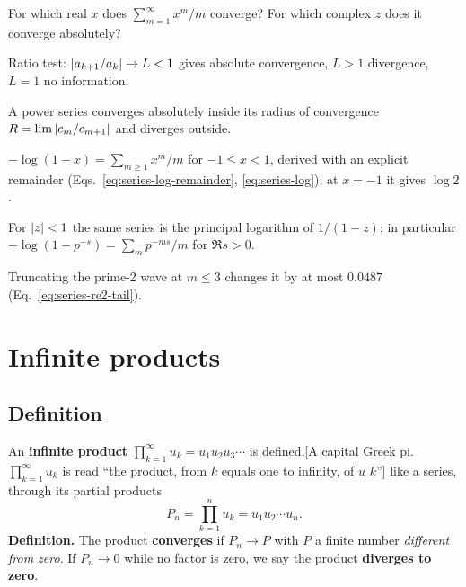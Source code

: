 \begin{checkpoint}
For which real $x$ does $\sum_{m=1}^\infty x^m/m$ converge? For which complex $z$ does it converge absolutely?
\end{checkpoint}

\begin{keyideas}
\item Ratio test: $\left\lvert a_{k+1}/a_k\right\rvert\to L<1$ gives absolute convergence, $L>1$ divergence, $L=1$ no information.
\item A power series converges absolutely inside its radius of convergence $R=\lim\left\lvert c_m/c_{m+1}\right\rvert$ and diverges outside.
\item $-\log(1-x)=\sum_{m\ge1}x^m/m$ for $-1\le x<1$, derived with an explicit remainder (Eqs.~\eqref{eq:series-log-remainder}, \eqref{eq:series-log}); at $x=-1$ it gives $\log2$.
\item For $\left\lvert z\right\rvert<1$ the same series is the principal logarithm of $1/(1-z)$; in particular $-\log(1-p^{-s})=\sum_m p^{-ms}/m$ for $\Re s>0$.
\item Truncating the prime-2 wave at $m\le3$ changes it by at most $0.0487$ (Eq.~\eqref{eq:series-re2-tail}).
\end{keyideas}

\section{Infinite products}\label{sec:series-products}

\subsection{Definition}

An \textbf{infinite product} $\prod_{k=1}^\infty u_k=u_1u_2u_3\cdots$ is defined,[A capital Greek pi. $\prod_{k=1}^{\infty}u_k$ is read ``the product, from $k$ equals one to infinity, of $u$ $k$''] like a series, through its partial products
\begin{equation}
P_n=\prod_{k=1}^nu_k=u_1u_2\cdots u_n .
\label{eq:series-prod-def}
\end{equation}
\textbf{Definition.} The product \textbf{converges} if $P_n\to P$ with $P$ a finite number \emph{different from zero}. If $P_n\to0$ while no factor is zero, we say the product \textbf{diverges to zero}.

